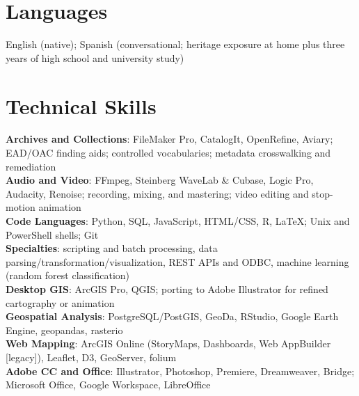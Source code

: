 \documentclass[letterpaper,10pt]{article}
\begin{document}
\section{Languages}
 \begin{itemize}[leftmargin=0.15in, label={}]
    \small{\item{
     English (native); Spanish (conversational; heritage exposure at home plus three years of high school and university study)
    }}
 \end{itemize}


\section{Technical Skills}
 \begin{itemize}[leftmargin=0.15in, label={}]
    \small{\item{
     \textbf{Archives and Collections}{: FileMaker Pro, CatalogIt, OpenRefine, Aviary; EAD/OAC finding aids; controlled vocabularies; metadata crosswalking and remediation} \\
     \textbf{Audio and Video}{: FFmpeg, Steinberg WaveLab \& Cubase, Logic Pro, Audacity, Renoise; recording, mixing, and mastering; video editing and stop-motion animation} \\
     \textbf{Code Languages}{: Python, SQL, JavaScript, HTML/CSS, R, \LaTeX; Unix and PowerShell shells; Git} \\
     \textbf{\hspace{0.15in}Specialties}{: scripting and batch processing, data parsing/transformation/visualization, REST APIs and ODBC, machine learning (random forest classification)} \\
     \textbf{Desktop GIS}{: ArcGIS Pro, QGIS; porting to Adobe Illustrator for refined cartography or animation} \\
     \textbf{Geospatial Analysis}{: PostgreSQL/PostGIS, GeoDa, RStudio, Google Earth Engine, geopandas, rasterio} \\
     \textbf{Web Mapping}{: ArcGIS Online (StoryMaps, Dashboards, Web AppBuilder [legacy]), Leaflet, D3, GeoServer, folium} \\
     \textbf{Adobe CC and Office}{: Illustrator, Photoshop, Premiere, Dreamweaver, Bridge; Microsoft Office, Google Workspace, LibreOffice}
    }}
 \end{itemize}


\end{document}
